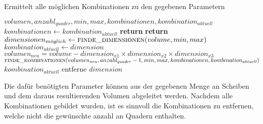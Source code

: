 \documentclass[a4paper,10pt,ngerman]{scrartcl}
\begin{document}
    \begin{algorithm}
        \caption{Ermittelt alle möglichen Kombinationen zu den gegebenen Parametern}\label{alg:euclid}
        \begin{algorithmic}[1]
            \Require $volumen, anzahl_{quader}, min, max, kombinationen, kombination_{aktuell}$
                    \State $kombinationen \gets kombination_{aktuell}$
                    \State \textbf{return}
                \EndIf
                    \State \textbf{return}
                \EndIf
                \State $dimensionen_{m\ddot oglich} \gets \textsc{finde\_dimensionen}(volume, min, max)$
                    \State $kombination_{aktuell} \gets dimension$
                    \State $volumen_{neu} = volume - dimension_{x1} \times dimension_{x2} \times dimension_{x3}$
                    \State $\textsc{finde\_kombinationen}(volumen_{neu}, anzahl_{quader} - 1, min, max, kombinationen, kombination_{aktuell})$
                    \State $kombination_{aktuell}$ entferne $dimension$
                \EndFor
            \EndFunction
        \end{algorithmic}
    \end{algorithm}

    Die dafür benötigten Parameter können aus der gegebenen Menge an Scheiben und dem daraus resultierenden Volumen abgeleitet werden.
    Nachdem alle Kombinationen gebildet wurden, ist es sinnvoll die Kombinationen zu entfernen, welche nicht die gewünschte anzahl an Quadern enthalten.
\end{document}
